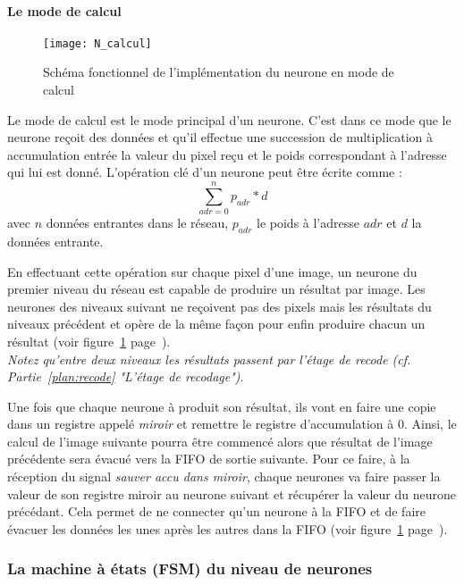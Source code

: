	\paragraph{Le mode de calcul\\}
	\begin{figure}[h!]
		\begin{center}
			\texttt{[image: N\_calcul]}
			\caption{Schéma fonctionnel de l'implémentation du neurone en mode de calcul}
			\label{fig:N_calcul}
		\end{center}
	\end{figure}

	Le mode de calcul est le mode principal d'un neurone. C'est dans ce mode que le neurone
	reçoit des données et qu'il effectue une succession de multiplication à accumulation entrée
	la valeur du pixel reçu et le poids correspondant à l'adresse qui lui est donné. L'opération clé
	d'un neurone peut être écrite comme :
	$$\sum_{adr=0}^n p_{adr}*d$$
	avec $n$ données entrantes dans le réseau, $p_{adr}$ le poids à l'adresse $adr$
	et $d$ la données entrante.

	En effectuant cette opération sur chaque pixel d'une image, un neurone du premier niveau du réseau
	est capable de produire un résultat par image. Les neurones des niveaux suivant ne reçoivent
	pas des pixels mais les résultats du niveaux précédent et opère de la même façon pour enfin
	produire chacun un résultat (voir figure~\ref{fig:N_calcul} page~\pageref{fig:N_calcul}).
	\\{\em Notez qu'entre deux niveaux les résultats passent par l'étage de recode
	(cf. Partie~\ref{plan:recode} "L'étage de recodage")}.

	Une fois que chaque neurone à produit son résultat, ils vont en faire une copie dans
	un registre appelé {\em miroir} et remettre le registre d'accumulation à 0. Ainsi,
	le calcul de l'image suivante pourra être commencé alors que résultat de l'image précédente
	sera évacué vers la FIFO de sortie suivante. Pour ce faire, à la réception du signal
	{\em sauver accu dans miroir}, chaque neurones va faire passer la valeur de son
	registre miroir au neurone suivant et récupérer la valeur du neurone précédant.
	Cela permet de ne connecter qu'un neurone à la FIFO
	et de faire évacuer les données les unes après les autres dans la FIFO
	(voir figure~\ref{fig:N_calcul} page~\pageref{fig:N_calcul}).

\subsubsection{La machine à états (FSM) du niveau de neurones}

